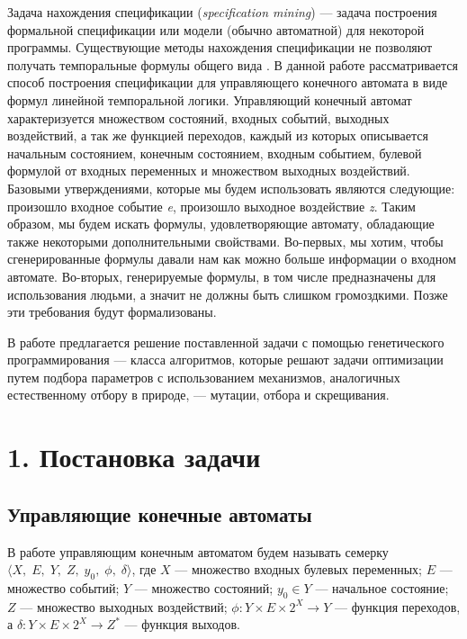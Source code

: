 \documentclass[12pt,fleqn]{article}
\begin{document}
Задача нахождения спецификации (\emph{specification mining}) --- задача построения формальной спецификации или модели
(обычно автоматной) для некоторой программы. Существующие методы нахождения спецификации не позволяют получать темпоральные
формулы общего вида \cite{sm1, sm2, sm3, sm4}. В данной работе рассматривается способ построения спецификации
для управляющего конечного автомата в виде формул линейной темпоральной логики.
Управляющий конечный автомат характеризуется множеством состояний, входных событий, выходных воздействий,
а так же функцией переходов, каждый из которых описывается начальным состоянием, конечным состоянием,
входным событием, булевой формулой от входных переменных и множеством выходных воздействий.
Базовыми утверждениями, которые мы будем использовать являются следующие: произошло входное событие
\emph{e}, произошло выходное воздействие \emph{z}. Таким образом, мы будем искать формулы, удовлетворяющие автомату,
обладающие также некоторыми дополнительными свойствами. Во-первых, мы хотим, чтобы сгенерированные
формулы давали нам как можно больше информации о входном автомате.
Во-вторых, генерируемые формулы, в том числе предназначены для использования людьми, а значит не должны быть слишком громоздкими.
Позже эти требования будут формализованы.

В работе предлагается решение поставленной задачи с помощью генетического программирования --- класса алгоритмов,
которые решают задачи оптимизации путем подбора параметров с использованием механизмов, аналогичных естественному
отбору в природе, --- мутации, отбора и скрещивания.

\section{1. Постановка задачи}

\subsection{Управляющие конечные автоматы}

В работе управляющим конечным автоматом будем называть семерку $\langle X,\; E,\; Y,\; Z,\; y_0,\; \phi,\; \delta \rangle$,
где $X$ --- множество входных булевых переменных; $E$ --- множество событий; $Y$ --- множество состояний;
$y_0 \in Y$ --- начальное состояние; $Z$ --- множество выходных воздействий;
$\phi : Y \times E \times 2^X \rightarrow Y$ --- функция переходов, а
$\delta : Y \times E \times 2^X \rightarrow Z^*$ --- функция выходов.
\end{document}
